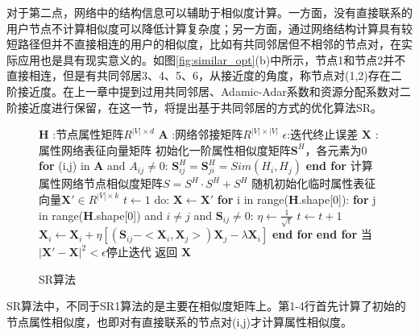 对于第二点，网络中的结构信息可以辅助于相似度计算。一方面，没有直接联系的用户节点不计算相似度可以降低计算复杂度；另一方面，通过网络结构计算具有较短路径但并不直接相连的用户的相似度，比如有共同邻居但不相邻的节点对，在实际应用也是具有现实意义的。如图\ref{fig:similar_opt}(b)中所示，节点1和节点2并不直接相连，但是有共同邻居3、4、5、6，从接近度的角度，称节点对(1,2)存在二阶接近度。在上一章中提到过用共同邻居、Adamic-Adar系数和资源分配系数对二阶接近度进行保留，在这一节，将提出基于共同邻居的方式的优化算法SR。

\begin{figure}[htb]
	\centering
	\begin{minipage}{.7\linewidth}
		\begin{algorithm}[H]
			\small
			\caption{SR算法}
			\begin{algorithmic}[1]
				\Require
				\Statex $\textbf{H}$ :节点属性矩阵$R^{|V|\times d}$
				\Statex $\textbf{A}$ :网络邻接矩阵$R^{|V|\times |V|}$ 
				\Statex $\epsilon$:迭代终止误差
				\Ensure
				\Statex $\textbf{X}$ :属性网络表征向量矩阵
				\Statex
				\State 初始化一阶属性相似度矩阵$\textbf{S}^{H}$，各元素为0
				\State \textbf{for} (i,j) in \textbf{A} and $A_{ij}\ne 0$:
				\State \quad $\textbf{S}^H_{ij} =\textbf{S}^H_{ji}=Sim(H_i, H_j)$
				\State \textbf{end for}
				\State 计算属性网络节点相似度矩阵$S = S^H\cdot S^H + S^H$
				\State 随机初始化临时属性表征向量$\textbf{X}'\in R^{|V|\times k}$
				\State $t \leftarrow 1$
				\State do:
				\State \quad $\textbf{X}\leftarrow\textbf{X}'$
				\State\quad \textbf{for} i in range(\textbf{H}.shape[0]):
				\State\qquad \textbf{for} j in range(\textbf{H}.shape[0]) and $i\ne j$ and $\textbf{S}_{ij}\ne0$:
				\State\quad \qquad $\eta \leftarrow \frac{1}{\sqrt{t}}$
				\State\quad \qquad $t\leftarrow t+1$
				\State\quad \qquad $\textbf{X}_i \leftarrow \textbf{X}_i + \eta [(\textbf{S}_{ij}-<\textbf{X}_i, \textbf{X}_j>)\textbf{X}_j - \lambda \textbf{X}_i]$
				\State \qquad \textbf{end for}
				\State \quad \textbf{end for}
				\State 当$|\textbf{X}'-\textbf{X}|^2<\epsilon$停止迭代
				\State 返回 $\textbf{X}$
			\end{algorithmic}
		\end{algorithm}
	\end{minipage}
\end{figure}

SR算法中，不同于SR1算法的是主要在相似度矩阵上。第1-4行首先计算了初始的节点属性相似度，也即对有直接联系的节点对(i,j)才计算属性相似度。

